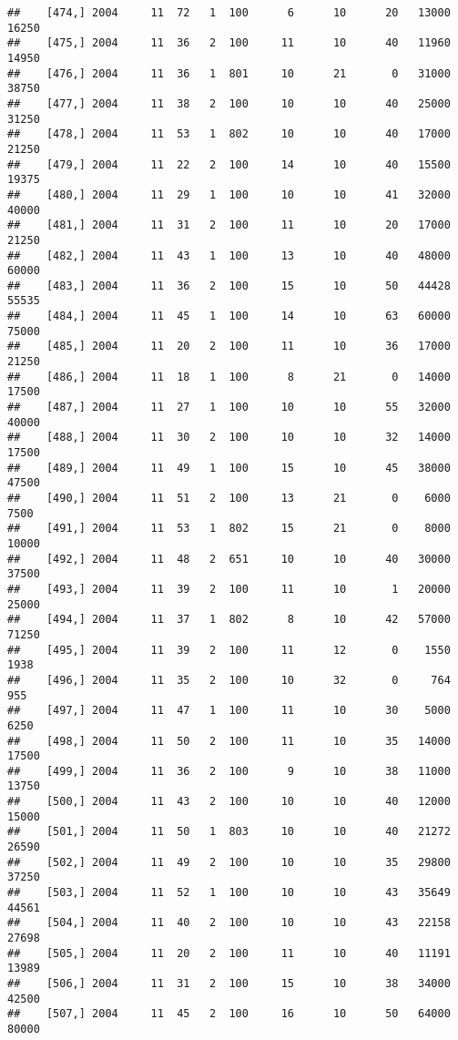 \documentclass{article}\usepackage[]{graphicx}\usepackage[]{color}
\makeatletter
\newenvironment{kframe}{%
 \def\at@end@of@kframe{}%
 \ifinner\ifhmode%
  \def\at@end@of@kframe{\end{minipage}}%
  \begin{minipage}{\columnwidth}%
 \fi\fi%
 \def\FrameCommand##1{\hskip\@totalleftmargin \hskip-\fboxsep
 \colorbox{shadecolor}{##1}\hskip-\fboxsep
     \hskip-\linewidth \hskip-\@totalleftmargin \hskip\columnwidth}%
 \MakeFramed {\advance\hsize-\width
   \@totalleftmargin\z@ \linewidth\hsize
   \@setminipage}}%
 {\par\unskip\endMakeFramed%
 \at@end@of@kframe}
\newenvironment{knitrout}{}{} %
\makeatother
\begin{document}
\begin{knitrout}
\begin{kframe}
\begin{verbatim}
##    [474,] 2004     11  72   1  100      6      10      20   13000   16250
##    [475,] 2004     11  36   2  100     11      10      40   11960   14950
##    [476,] 2004     11  36   1  801     10      21       0   31000   38750
##    [477,] 2004     11  38   2  100     10      10      40   25000   31250
##    [478,] 2004     11  53   1  802     10      10      40   17000   21250
##    [479,] 2004     11  22   2  100     14      10      40   15500   19375
##    [480,] 2004     11  29   1  100     10      10      41   32000   40000
##    [481,] 2004     11  31   2  100     11      10      20   17000   21250
##    [482,] 2004     11  43   1  100     13      10      40   48000   60000
##    [483,] 2004     11  36   2  100     15      10      50   44428   55535
##    [484,] 2004     11  45   1  100     14      10      63   60000   75000
##    [485,] 2004     11  20   2  100     11      10      36   17000   21250
##    [486,] 2004     11  18   1  100      8      21       0   14000   17500
##    [487,] 2004     11  27   1  100     10      10      55   32000   40000
##    [488,] 2004     11  30   2  100     10      10      32   14000   17500
##    [489,] 2004     11  49   1  100     15      10      45   38000   47500
##    [490,] 2004     11  51   2  100     13      21       0    6000    7500
##    [491,] 2004     11  53   1  802     15      21       0    8000   10000
##    [492,] 2004     11  48   2  651     10      10      40   30000   37500
##    [493,] 2004     11  39   2  100     11      10       1   20000   25000
##    [494,] 2004     11  37   1  802      8      10      42   57000   71250
##    [495,] 2004     11  39   2  100     11      12       0    1550    1938
##    [496,] 2004     11  35   2  100     10      32       0     764     955
##    [497,] 2004     11  47   1  100     11      10      30    5000    6250
##    [498,] 2004     11  50   2  100     11      10      35   14000   17500
##    [499,] 2004     11  36   2  100      9      10      38   11000   13750
##    [500,] 2004     11  43   2  100     10      10      40   12000   15000
##    [501,] 2004     11  50   1  803     10      10      40   21272   26590
##    [502,] 2004     11  49   2  100     10      10      35   29800   37250
##    [503,] 2004     11  52   1  100     10      10      43   35649   44561
##    [504,] 2004     11  40   2  100     10      10      43   22158   27698
##    [505,] 2004     11  20   2  100     11      10      40   11191   13989
##    [506,] 2004     11  31   2  100     15      10      38   34000   42500
##    [507,] 2004     11  45   2  100     16      10      50   64000   80000

\end{verbatim}
\end{kframe}
\end{knitrout}
\end{document}
